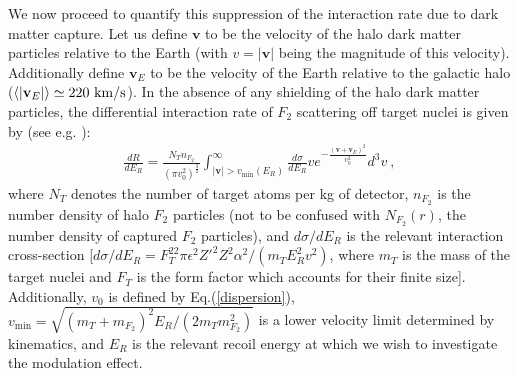 \documentclass[12pt]{article}
\begin{document}
We now proceed to quantify this suppression of the interaction rate due to dark matter capture. Let us define $\mathbf{v}$ to be the velocity of the halo dark matter particles relative to the Earth (with $v = |\mathbf{v}|$ being the magnitude of this velocity). Additionally define $\mathbf{v}_E$ to be the velocity of the Earth relative to the galactic halo ($\langle |\mathbf{v} _E| \rangle \simeq 220 \ \rm km/s$). In the absence of any shielding of the halo dark matter particles, the differential interaction rate of $F_2$ scattering off target nuclei is given by (see e.g. \cite{footdiurnal}):
%
\begin{eqnarray}
\frac{dR}{dE _R} = \frac{N _Tn _{F_2}}{(\pi v _0 ^2) ^{\frac{3}{2}}}\int _{|\mathbf{v}| > v _{\min}(E _R)} ^{\infty} \frac{d\sigma}{dE _R}ve ^{-\frac{(\mathbf{v} + \mathbf{v} _E) ^2}{v _0 ^2}} d^3v \ ,
\label{drder}
\end{eqnarray}
%
where $N _T$ denotes the number of target atoms per kg of detector, $n _{F_2}$ is the number density of halo $F_2$ particles (not to be confused with $N _{F_2}(r)$, the number density of captured $F_2$ particles), and $d\sigma /dE _R$ is the relevant interaction cross-section [$d\sigma/dE _R = F_T ^22\pi \epsilon ^2{Z'} ^2Z ^2\alpha ^2/(m _TE _R ^2v ^2)$, where $m_T$ is the mass of the target nuclei and $F_T$ is the form factor which accounts for their finite size]. Additionally, $v _0$ is defined by Eq.(\ref{dispersion}), $v _{\min} = \sqrt{(m _T + m _{F_2}) ^2E _R/(2m _Tm _{F_2} ^2)}$ is a lower velocity limit determined by kinematics, and $E_R$ is the relevant recoil energy at which we wish to investigate the modulation effect. 
\end{document}
